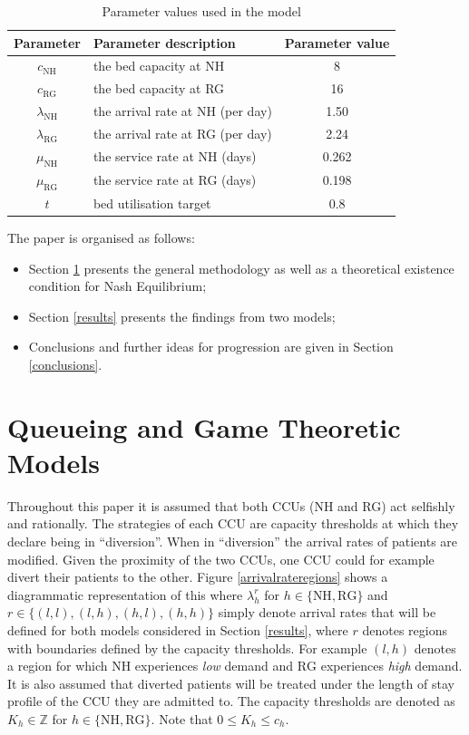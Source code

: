 \documentclass{article}
\newcommand{\NH}{\text{NH}}
\newcommand{\RG}{\text{RG}}
\begin{document}
\begin{table}[!htbp]
\begin{center}
\begin{tabular}{c|lc}
\toprule
Parameter&Parameter description&Parameter value\\
\midrule
$c_{\NH}$&the bed capacity at NH&8\\
$c_{\RG}$&the bed capacity at RG&16\\
$\lambda_{\NH}$&the arrival rate at NH (per day)&1.50 \\
$\lambda_{\RG}$&the arrival rate at RG (per day)&2.24\\
$\mu_{\NH}$&the service rate at NH (days)&0.262\\
$\mu_{\RG}$&the service rate at RG (days)&0.198\\
$t$& bed utilisation target & 0.8\\
\bottomrule
\end{tabular}
\end{center}
\caption{Parameter values used in the model}\label{parameter_values_model_1}
\end{table}

The paper is organised as follows:
\begin{itemize}
    \item Section \ref{queueingandgamemodels} presents the general methodology as well as a theoretical existence condition for Nash Equilibrium;
    \item Section \ref{results} presents the findings from two models;
    \item Conclusions and further ideas for progression are given in Section \ref{conclusions}.
\end{itemize}

\section{Queueing and Game Theoretic Models} \label{queueingandgamemodels}

Throughout this paper it is assumed that both CCUs (NH and RG) act selfishly and rationally.
The strategies of each CCU are capacity thresholds at which they declare being in ``diversion''. When in ``diversion'' the arrival rates of patients are modified.
Given the proximity of the two CCUs, one CCU could for example divert their patients to the other.
Figure \ref{arrivalrateregions} shows a diagrammatic representation of this where $\lambda_h^{r}$ for $h\in\{\NH, \RG\}$ and $r\in\{(l,l), (l,h), (h,l), (h,h)\}$ simply denote arrival rates that will be defined for both models considered in Section \ref{results}, where $r$ denotes regions with boundaries defined by the capacity thresholds.
For example $(l,h)$ denotes a region for which $\NH$ experiences \textit{low} demand and $\RG$ experiences \textit{high} demand.
It is also assumed that diverted patients will be treated under the length of stay profile of the CCU they are admitted to.
The capacity thresholds are denoted as $K_{h}\in\mathbb{Z}$ for $h\in\{\NH,\RG\}$. Note that $0\leq K_h\leq c_h$.
\end{document}
